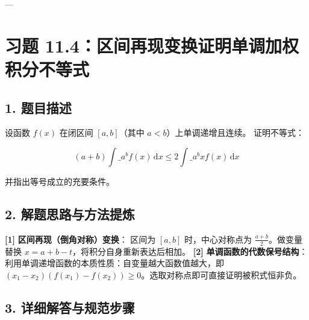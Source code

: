 \documentclass[11pt,a4paper,UTF8]{ctexart}
\begin{document}
---


\section{习题 11.4：区间再现变换证明单调加权积分不等式}


\subsection{1. 题目描述}
设函数 $f(x)$ 在闭区间 $[a, b]$（其中 $a < b$）上单调递增且连续。
证明不等式：

\begin{equation*}
(a+b)\int\_a^b f(x)\,\mathrm{d}x \le 2\int\_a^b x f(x)\,\mathrm{d}x
\end{equation*}

并指出等号成立的充要条件。


\subsection{2. 解题思路与方法提炼}
\begin{solbox}[分步推导与答题规范]
\textbf{[1]}  \textbf{区间再现（倒角对称）变换}：
区间为 $[a, b]$ 时，中心对称点为 $\frac{a+b}{2}$。做变量替换 $x = a + b - t$，将积分自身重新表达后相加。
\textbf{[2]}  \textbf{单调函数的代数保号结构}：
利用单调递增函数的本质性质：自变量越大函数值越大，即 $(x_1 - x_2)(f(x_1) - f(x_2)) \ge 0$。选取对称点即可直接证明被积式恒非负。
\end{solbox}


\subsection{3. 详细解答与规范步骤}
\end{document}
